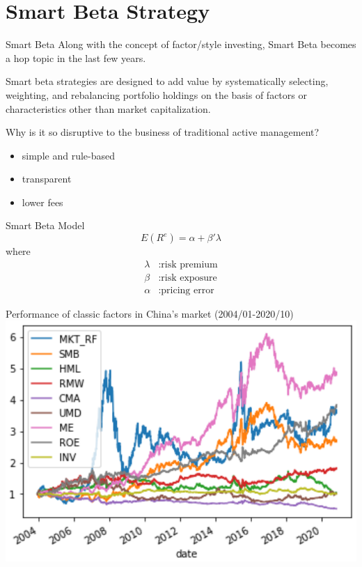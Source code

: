 \documentclass[aspectratio=169,11pt]{beamer}
\begin{document}
    \section{Smart Beta Strategy}
    \begin{frame}{Smart Beta}
        Along with the concept of factor/style investing, Smart Beta becomes a hop topic in the last few years.
        \begin{definition}
            Smart beta strategies are designed to add value by systematically selecting, weighting, and rebalancing portfolio holdings on the basis of factors or characteristics other than market capitalization.
        \end{definition}
        Why is it so disruptive to the business of traditional active management?
        \begin{itemize}
            \item simple and rule-based
            \item transparent
            \item lower fees
        \end{itemize}
    \end{frame}

    \begin{frame}{Smart Beta Model}
        \[E(R^e)=\alpha+\beta'\lambda\]
        where
        \begin{align*}
            \lambda&:\text{risk premium}\\
            \beta&:\text{risk exposure}\\
            \alpha&:\text{pricing error}
        \end{align*}
    \end{frame}

    \begin{frame}{Performance of classic factors in China's market (2004/01-2020/10)}
        \centering
        \includegraphics[width=0.6\linewidth]{factors_cn.png}
    \end{frame}
\end{document}
